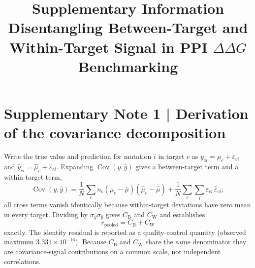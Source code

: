 \documentclass[11pt,a4paper]{article}
\title{\bfseries Supplementary Information\\[6pt]
\large Disentangling Between-Target and Within-Target Signal in
PPI $\Delta\Delta G$ Benchmarking}
\author{}
\date{}
\begin{document}
\maketitle

\section*{Supplementary Note 1 | Derivation of the covariance decomposition}
Write the true value and prediction for mutation $i$ in target $c$ as
$y_{ci} = \mu_c + \varepsilon_{ci}$ and
$\hat{y}_{ci} = \hat{\mu}_c + \hat{\varepsilon}_{ci}$. Expanding
$\operatorname{Cov}(y,\hat{y})$ gives a between-target term and a within-target term,
\begin{equation}
  \operatorname{Cov}(y,\hat{y})
  = \frac{1}{N}\sum_{c} n_c \left(\mu_c - \bar{\mu}\right)
    \left(\hat{\mu}_c - \bar{\hat{\mu}}\right)
  + \frac{1}{N}\sum_{c}\sum_{i} \varepsilon_{ci}\,\hat{\varepsilon}_{ci};
\end{equation}
all cross terms vanish identically because within-target deviations have zero mean in every
target. Dividing by $\sigma_y \sigma_{\hat{y}}$ gives $C_{\mathrm{B}}$ and
$C_{\mathrm{W}}$ and establishes
\begin{equation}
  r_{\mathrm{pooled}} = C_{\mathrm{B}} + C_{\mathrm{W}}
\end{equation}
exactly. The identity residual is reported as a quality-control quantity (observed maximum
$3.331 \times 10^{-16}$). Because $C_{\mathrm{B}}$ and $C_{\mathrm{W}}$ share the same
denominator they are covariance-signal contributions on a common scale, not independent
correlations.
\end{document}
